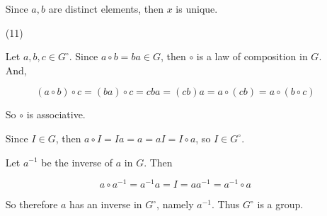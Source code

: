 \documentclass[12pt]{article}
\begin{document}
\begin{itemize}
Since $a, b$ are distinct elements, then $x$ is unique.

\item[(11)]

Let $a, b, c \in G^\circ$. Since $a \circ b = ba \in G$, then $\circ$ is a law of composition in $G$. And,

$$(a \circ b) \circ c = (ba) \circ c = cba = (cb)a = a \circ (cb) = a \circ (b \circ c)$$

So $\circ$ is associative.



Since $I \in G$, then $a \circ I = Ia = a = aI = I \circ a$, so $I \in G^\circ$.



Let $a^{-1}$ be the inverse of $a$ in $G$. Then

$$a \circ a^{-1} = a^{-1}a = I = aa^{-1} = a^{-1} \circ a$$



So therefore $a$ has an inverse in $G^\circ$, namely $a^{-1}$. Thus $G^\circ$ is a group.

\end{itemize}
\end{document}
